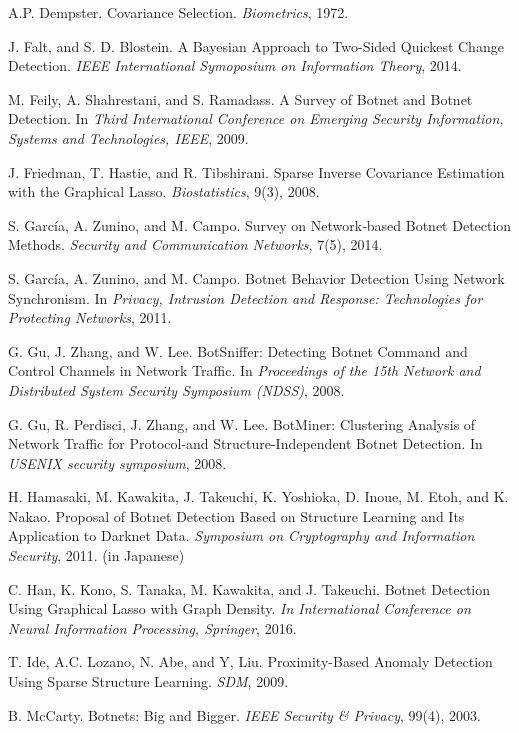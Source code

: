 \documentclass[letterpaper]{sig-alternate-10pt}
\begin{document}
\begin{thebibliography}{100}
A.P. Dempster. Covariance Selection. {\it Biometrics}, 1972.

J. Falt, and S. D. Blostein. A Bayesian Approach to Two-Sided Quickest Change Detection. {\it IEEE International Symoposium on Information Theory}, 2014.

M. Feily, A. Shahrestani, and S. Ramadass. A Survey of Botnet and Botnet Detection. In {\it Third International Conference on Emerging Security Information, Systems and Technologies, IEEE}, 2009.

J. Friedman, T. Hastie, and R. Tibshirani. Sparse Inverse Covariance Estimation with the Graphical Lasso. {\it Biostatistics}, 9(3), 2008.

S. Garc\'{i}a, A. Zunino, and M. Campo. Survey on Network‐based Botnet Detection Methods. {\it Security and Communication Networks}, 7(5), 2014.

S. Garc\'{i}a, A. Zunino, and M. Campo. Botnet Behavior Detection Using Network Synchronism. In {\it Privacy, Intrusion Detection and Response: Technologies for Protecting Networks}, 2011.

G. Gu, J. Zhang, and W. Lee. BotSniffer: Detecting Botnet Command and Control Channels in Network Traffic. In {\it Proceedings of the 15th Network and Distributed System Security Symposium (NDSS)}, 2008.

G. Gu, R. Perdisci, J. Zhang, and W. Lee. BotMiner: Clustering Analysis of Network Traffic for Protocol-and Structure-Independent Botnet Detection. In {\it USENIX security symposium}, 2008.

H. Hamasaki, M. Kawakita, J. Takeuchi, K. Yoshioka, D. Inoue, M. Etoh, and K. Nakao. Proposal of Botnet Detection Based on Structure Learning and Its Application to Darknet Data. {\it Symposium on Cryptography and Information Security}, 2011. (in Japanese)

C. Han, K. Kono, S. Tanaka, M. Kawakita, and J. Takeuchi. Botnet Detection Using Graphical Lasso with Graph Density. {\it In International Conference on Neural Information Processing, Springer}, 2016.

T. Ide, A.C. Lozano, N. Abe, and Y, Liu. Proximity-Based Anomaly Detection Using Sparse Structure Learning. {\it SDM}, 2009.

B. McCarty. Botnets: Big and Bigger. {\it IEEE Security \& Privacy}, 99(4), 2003.


\end{thebibliography}
\end{document}
